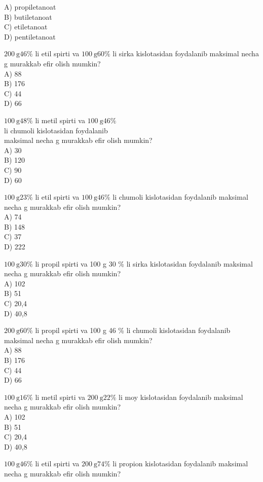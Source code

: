 A) propiletanoat\\
B) butiletanoat\\
C) etiletanoat\\
D) pentiletanoat
  \item $200 \mathrm{~g} 46 \%$ li etil spirti va $100 \mathrm{~g} 60 \%$ li sirka kislotasidan foydalanib maksimal necha g murakkab efir olish mumkin?\\
A) 88\\
B) 176\\
C) 44\\
D) 66
  \item $100 \mathrm{~g} 48 \%$ li metil spirti va $100 \mathrm{~g} 46 \%$\\
li chumoli kislotasidan foydalanib\\
maksimal necha g murakkab efir olish mumkin?\\
A) 30\\
B) 120\\
C) 90\\
D) 60
  \item $100 \mathrm{~g} 23 \%$ li etil spirti va $100 \mathrm{~g} 46 \%$ li chumoli kislotasidan foydalanib maksimal necha g murakkab efir olish mumkin?\\
A) 74\\
B) 148\\
C) 37\\
D) 222
  \item $100 \mathrm{~g} 30 \%$ li propil spirti va 100 g 30 \% li sirka kislotasidan foydalanib maksimal necha g murakkab efir olish mumkin?\\
A) 102\\
B) 51\\
C) 20,4\\
D) 40,8
  \item $200 \mathrm{~g} 60 \%$ li propil spirti va 100 g 46 \% li chumoli kislotasidan foydalanib maksimal necha g murakkab efir olish mumkin?\\
A) 88\\
B) 176\\
C) 44\\
D) 66
  \item $100 \mathrm{~g} 16 \%$ li metil spirti va $200 \mathrm{~g} 22 \%$ li moy kislotasidan foydalanib maksimal necha g murakkab efir olish mumkin?\\
A) 102\\
B) 51\\
C) 20,4\\
D) 40,8
  \item $100 \mathrm{~g} 46 \%$ li etil spirti va $200 \mathrm{~g} 74 \%$ li propion kislotasidan foydalanib maksimal necha g murakkab efir olish mumkin?\\
